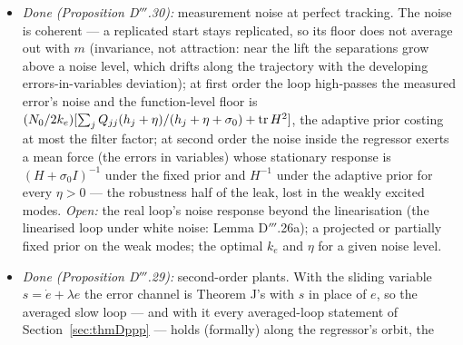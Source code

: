 \begin{enumerate}[label=\arabic*.,leftmargin=*]
\begin{itemize}
      regressor (the adaptive law's regressor at the reference) keeps the lift, the linearisation and the first-order
      floor while turning the noise's own persistent force into a least-squares one, bounded uniformly in $k_e$ and in
      the spectrum --- the parameters' fluctuation adding a force that is not the learning force of a mean tracking
      error (the classical second-order bias of a constant-gain stochastic approximation): small in absolute terms on
      the instance ($\le3.9\cdot10^{-4}$ per $(\E\nu^2)^2$), $-8.7\%$ to $+3.3\%$ of DR's and DR*'s biases and
      $+56\%$ of DR's at $k_e = B = 100$, its own response falling like $k_e^{-2}$ on a one-dimensional reference, where
      the law's leading term averages out --- which on a curve in $\R^n$ it need not. \emph{Open:} the second-order
      computation made rigorous, the parameters' part in closed form, and in $\R^n$; the stationary biases in the real
      loop (the weak modes need ${\sim}10^5$ time units); a sensor model with quantisation and delay.
    \item \emph{Done (Proposition D$'''$.30):} measurement noise at perfect tracking. The noise is coherent --- a
      replicated start stays replicated, so its floor does not average out with $m$ (invariance, not attraction: near
      the lift the separations grow above a noise level, which drifts along the trajectory with the developing
      errors-in-variables deviation); at first order the loop high-passes the measured error's noise and the
      function-level floor is $(N_0/2k_e)[\sum_jQ_{jj}(h_j + \eta)/(h_j + \eta + \sigma_0) + \operatorname{tr} H^2]$, the adaptive
      prior costing at most the filter factor; at second order the noise inside the regressor exerts a mean force (the
      errors in variables) whose stationary response is $(H + \sigma_0I)^{-1}$ under the fixed prior and $H^{-1}$ under
      the adaptive prior for every $\eta > 0$ --- the robustness half of the leak, lost in the weakly excited modes.
      \emph{Open:} the real loop's noise response beyond the linearisation (the linearised loop under white noise:
      Lemma D$'''$.26a); a projected or partially fixed prior on the weak modes; the optimal $k_e$ and $\eta$ for a
      given noise level.
    \item \emph{Done (Proposition D$'''$.29):} second-order plants. With the sliding variable $s = \dot e + \lambda e$
      the error channel is Theorem J's with $s$ in place of $e$, so the averaged slow loop --- and with it every
      averaged-loop statement of Section~\ref{sec:thmDppp} --- holds (formally) along the regressor's orbit, the

\end{itemize}
\end{enumerate}
